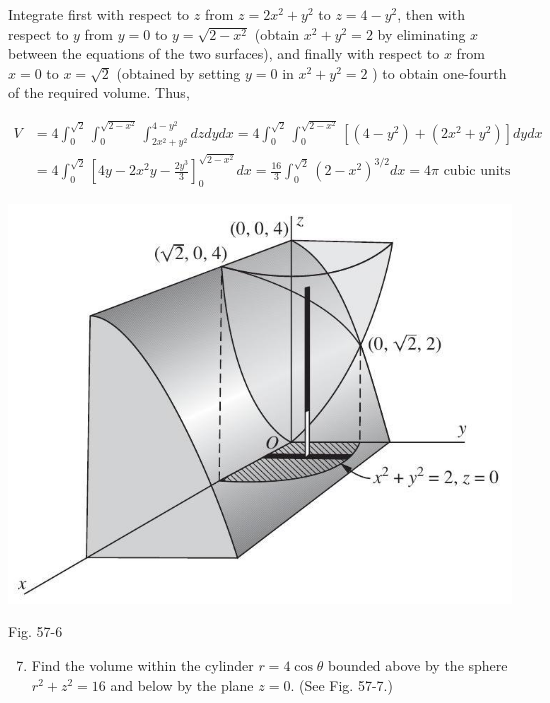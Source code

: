 \documentclass[10pt]{article}
\begin{document}
Integrate first with respect to $z$ from $z=2 x^{2}+y^{2}$ to $z=4-y^{2}$, then with respect to $y$ from $y=0$ to $y=\sqrt{2-x^{2}}$ (obtain $x^{2}+y^{2}=2$ by eliminating $x$ between the equations of the two surfaces), and finally with respect to $x$ from $x=0$ to $x=\sqrt{2}$ (obtained by setting $y=0$ in $x^{2}+y^{2}=2$ ) to obtain one-fourth of the required volume. Thus,

$$
\begin{aligned}
V & =4 \int_{0}^{\sqrt{2}} \int_{0}^{\sqrt{2-x^{2}}} \int_{2 x^{2}+y^{2}}^{4-y^{2}} d z d y d x=4 \int_{0}^{\sqrt{2}} \int_{0}^{\sqrt{2-x^{2}}}\left[\left(4-y^{2}\right)+\left(2 x^{2}+y^{2}\right)\right] d y d x \\
& =4 \int_{0}^{\sqrt{2}}\left[4 y-2 x^{2} y-\frac{2 y^{3}}{3}\right]_{0}^{\sqrt{2-x^{2}}} d x=\frac{16}{3} \int_{0}^{\sqrt{2}}\left(2-x^{2}\right)^{3 / 2} d x=4 \pi \text { cubic units }
\end{aligned}
$$

\begin{center}
\includegraphics[max width=\textwidth]{2024_04_20_fe2e8e718cc0fcd63d1bg-05}
\end{center}

Fig. 57-6

\begin{enumerate}
  \setcounter{enumi}{6}
  \item Find the volume within the cylinder $r=4 \cos \theta$ bounded above by the sphere $r^{2}+z^{2}=16$ and below by the plane $z=0$. (See Fig. 57-7.)
\end{enumerate}
\end{document}
